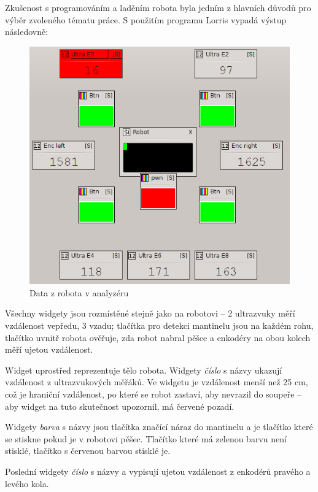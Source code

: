 \documentclass[12pt, a4paper, oneside]{article}
\newcommand{\It}{\textit}  %
\begin{document}
Zkušenost s programováním a laděním robota byla jedním z hlavních důvodů pro výběr zvoleného tématu práce. S použitím programu Lorris vypadá výstup následovně:
\begin{figure}[H]
\begin{center}
\includegraphics{img/use_david2.png}
\caption{Data z robota v analyzéru}
\end{center}
\end{figure}

Všechny widgety jsou rozmístěné stejně jako na robotovi -- 2 ultrazvuky měří vzdálenost vepředu, 3 vzadu; tlačítka pro detekci mantinelu jsou na každém rohu, tlačítko uvnitř robota ověřuje,  zda robot nabral pěšce a enkodéry na obou kolech měří ujetou vzdálenost.

Widget  uprostřed reprezentuje tělo robota. Widgety \It{číslo} s názvy  ukazují vzdálenost z ultrazvukových měřáků. Ve widgetu  je vzdálenost menší než 25 cm, což je hraniční vzdálenost, po které se robot zastaví, aby nevrazil do soupeře -- aby widget na tuto skutečnost upozornil, má červené pozadí.

Widgety \It{barva} s názvy  jsou tlačítka značící náraz do mantinelu a  je tlačítko které se stiskne pokud je v robotovi pěšec. Tlačítko které má zelenou barvu není stisklé, tlačítko s červenou barvou stisklé je.

Poslední widgety \It{číslo} s názvy  a  vypisují ujetou vzdálenost z enkodérů pravého a levého kola.
\end{document}
